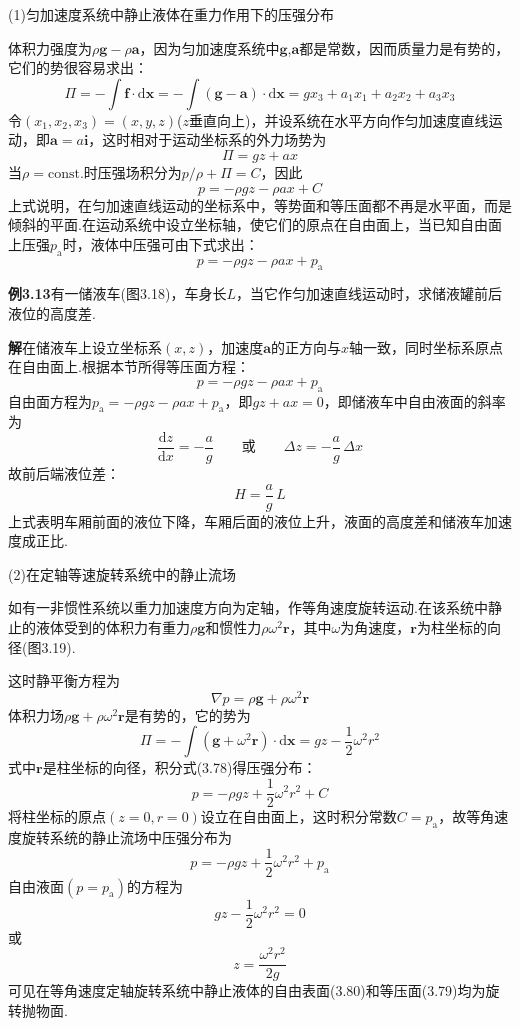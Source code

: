 (1)匀加速度系统中静止液体在重力作用下的压强分布

体积力强度为$\rho\boldsymbol{g}-\rho\boldsymbol{a}$，因为匀加速度系统中$\boldsymbol{g}$,$\boldsymbol{a}$都是常数，因而质量力是有势的，它们的势很容易求出：
\[
\Pi=-\int\boldsymbol{f}\cdot\mathrm{d}\boldsymbol{x}=-\int(\boldsymbol{g}-\boldsymbol{a})\cdot\mathrm{d}\boldsymbol{x}=gx_3+a_1x_1+a_2x_2+a_3x_3
\]
令$(x_1,x_2,x_3)=(x,y,z)$($z$垂直向上)，并设系统在水平方向作匀加速度直线运动，即$\boldsymbol{a}=a\boldsymbol{i}$，这时相对于运动坐标系的外力场势为
\[
\Pi=gz+ax
\]
当$\rho=\mathrm{const.}$时压强场积分为$p/\rho+\Pi=C$，因此
\[
p=-\rho gz-\rho ax+C
\]
上式说明，在匀加速直线运动的坐标系中，等势面和等压面都不再是水平面，而是倾斜的平面.在运动系统中设立坐标轴，使它们的原点在自由面上，当已知自由面上压强$p_{\mathrm{a}}$时，液体中压强可由下式求出：
\begin{equation*}
p=-\rho gz-\rho ax+p_{\mathrm{a}}
\tag{3.77}
\end{equation*}

\noindent\textbf{例3.13}\quad 有一储液车(图3.18)，车身长$L$，当它作匀加速直线运动时，求储液罐前后液位的高度差.

\noindent\textbf{解}\quad 在储液车上设立坐标系$(x,z)$，加速度$\boldsymbol{a}$的正方向与$x$轴一致，同时坐标系原点在自由面上.根据本节所得等压面方程：
\[
p=-\rho gz-\rho ax+p_{\mathrm{a}}
\]
自由面方程为$p_{\mathrm{a}}=-\rho gz-\rho ax+p_{\mathrm{a}}$，即$gz+ax=0$，即储液车中自由液面的斜率为
\[
\frac{\mathrm{d}z}{\mathrm{d}x}=-\frac{a}{g}\qquad\text{或}\qquad \Delta z=-\frac{a}{g}\,\Delta x
\]
故前后端液位差：
\[
H=\frac{a}{g}\,L
\]
上式表明车厢前面的液位下降，车厢后面的液位上升，液面的高度差和储液车加速度成正比.

(2)在定轴等速旋转系统中的静止流场

如有一非惯性系统以重力加速度方向为定轴，作等角速度旋转运动.在该系统中静止的液体受到的体积力有重力$\rho\boldsymbol{g}$和惯性力$\rho\omega^{2}\boldsymbol{r}$，其中$\omega$为角速度，$\boldsymbol{r}$为柱坐标的向径(图3.19).

这时静平衡方程为
\begin{equation*}
\nabla p=\rho\boldsymbol{g}+\rho\omega^{2}\boldsymbol{r}
\tag{3.78}
\end{equation*}
体积力场$\rho\boldsymbol{g}+\rho\omega^{2}\boldsymbol{r}$是有势的，它的势为
\[
\Pi=-\int(\boldsymbol{g}+\omega^{2}\boldsymbol{r})\cdot\mathrm{d}\boldsymbol{x}=gz-\frac{1}{2}\omega^{2}r^{2}
\]
式中$\boldsymbol{r}$是柱坐标的向径，积分式(3.78)得压强分布：
\[
p=-\rho gz+\frac{1}{2}\omega^{2}r^{2}+C
\]
将柱坐标的原点$(z=0,r=0)$设立在自由面上，这时积分常数$C=p_{\mathrm{a}}$，故等角速度旋转系统的静止流场中压强分布为
\begin{equation*}
p=-\rho gz+\frac{1}{2}\omega^{2}r^{2}+p_{\mathrm{a}}
\tag{3.79}
\end{equation*}
自由液面$(p=p_{\mathrm{a}})$的方程为
\[
gz-\frac{1}{2}\omega^{2}r^{2}=0
\]
或
\begin{equation*}
z=\frac{\omega^{2}r^{2}}{2g}
\tag{3.80}
\end{equation*}
可见在等角速度定轴旋转系统中静止液体的自由表面(3.80)和等压面(3.79)均为旋转抛物面.
